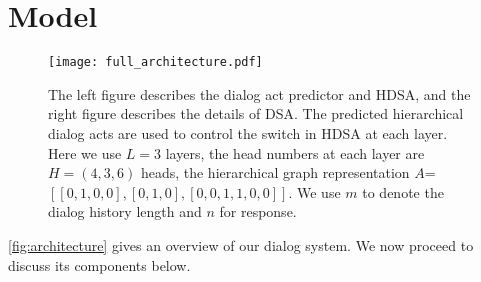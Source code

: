 \documentclass[11pt,a4paper]{article}
\begin{document}
\section{Model}
\begin{figure*}[thb]
\begin{center}
    \texttt{[image: full\_architecture.pdf]}
    \end{center}
    \caption{The left figure describes the dialog act predictor and HDSA, and the right figure describes the details of DSA. The predicted hierarchical dialog acts are used to control the switch in HDSA at each layer. Here we use $L=3$ layers, the head numbers at each layer are $H=(4, 3, 6)$ heads, the hierarchical graph representation $A$=$[[0, 1, 0, 0], [0, 1, 0], [0, 0, 1, 1, 0, 0]]$. We use $m$ to denote the dialog history length and $n$ for response.}
    \label{fig:architecture}
\end{figure*}
\autoref{fig:architecture} gives an overview of our dialog system. We now proceed to discuss its components below.
\end{document}
